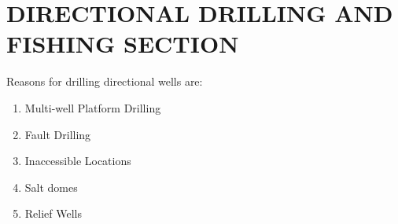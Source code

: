 \chapter{DIRECTIONAL DRILLING AND FISHING SECTION}

\onehalfspacing

Reasons for drilling directional wells are:

\begin{enumerate}
\item Multi-well Platform Drilling
\item Fault Drilling
\item Inaccessible Locations
\item Salt domes
\item Relief Wells
\end{enumerate}

